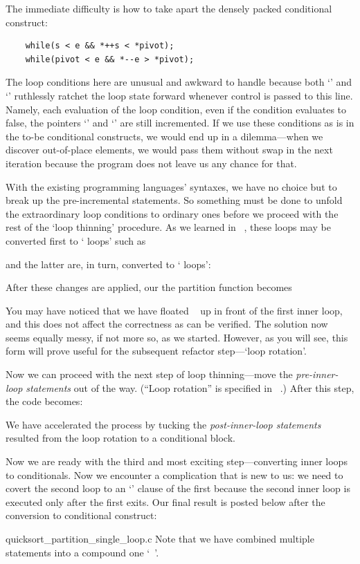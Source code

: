 The immediate difficulty is how to take apart the densely packed conditional construct:
\begin{lstlisting}
    while(s < e && *++s < *pivot);
    while(pivot < e && *--e > *pivot);
\end{lstlisting}
The loop conditions here are unusual and awkward to handle
because both `' and `' ruthlessly ratchet the loop state forward
whenever control is passed to this line.
Namely, each evaluation of the loop condition, even if the condition evaluates to false, the
pointers `' and `' are still incremented.
If we use these conditions as is in the to-be conditional constructs, we would end up in a
dilemma---when we discover out-of-place elements, we would pass them without swap in the next
iteration because the program does not leave us any chance for that.


With the existing programming languages' syntaxes, we have no choice but to break
up the pre-incremental statements.
So something must be done to unfold the extraordinary loop conditions to
ordinary ones before we proceed with the rest of the `loop thinning' procedure.
As we learned in ~, these loops may be converted first to
` loops' such as

and the latter are, in turn, converted to ` loops':

After these changes are applied, our the partition function becomes

You may have noticed that we have floated ~ up in front of the first inner loop,
and this does not affect the correctness as can be verified.
The solution now seems equally messy, if not more so, as we started.
However, as you will see, this form will prove useful for the subsequent refactor step---`loop
rotation'.


Now we can proceed with the next step
of loop thinning---move the \emph{pre-inner-loop statements} out of the way.
(``Loop rotation'' is specified in ~.)
After this step, the code becomes:

We have accelerated the process by tucking the \emph{post-inner-loop statements}
resulted from the loop rotation to a conditional block.


Now we are ready with the third and most exciting step---converting inner loops to conditionals.
Now we encounter a complication that is new to us: we need to covert the second loop to an
`' clause of the first because the second inner loop is executed only after the first
exits.
Our final result is posted below after the conversion to conditional construct:

{quicksort_partition_single_loop.c}
Note that we have combined multiple statements into a compound one `~'.


